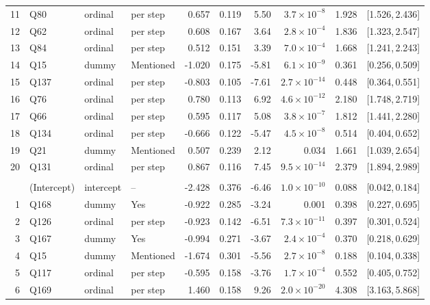 \begin{landscape}
\begin{longtable}{r l l l r r r r r c}
11 & Q80 & ordinal & per step & 0.657 & 0.119 & 5.50 & $3.7{\times}10^{-8}$ & 1.928 & [1.526,\,2.436] &  \\
12 & Q62 & ordinal & per step & 0.608 & 0.167 & 3.64 & $2.8{\times}10^{-4}$ & 1.836 & [1.323,\,2.547] &  \\
13 & Q84 & ordinal & per step & 0.512 & 0.151 & 3.39 & $7.0{\times}10^{-4}$ & 1.668 & [1.241,\,2.243] &  \\
14 & Q15 & dummy & Mentioned & -1.020 & 0.175 & -5.81 & $6.1{\times}10^{-9}$ & 0.361 & [0.256,\,0.509] &  \\
15 & Q137 & ordinal & per step & -0.803 & 0.105 & -7.61 & $2.7{\times}10^{-14}$ & 0.448 & [0.364,\,0.551] &  \\
16 & Q76 & ordinal & per step & 0.780 & 0.113 & 6.92 & $4.6{\times}10^{-12}$ & 2.180 & [1.748,\,2.719] &  \\
17 & Q66 & ordinal & per step & 0.595 & 0.117 & 5.08 & $3.8{\times}10^{-7}$ & 1.812 & [1.441,\,2.280] &  \\
18 & Q134 & ordinal & per step & -0.666 & 0.122 & -5.47 & $4.5{\times}10^{-8}$ & 0.514 & [0.404,\,0.652] &  \\
19 & Q21 & dummy & Mentioned & 0.507 & 0.239 & 2.12 & 0.034 & 1.661 & [1.039,\,2.654] &  \\
20 & Q131 & ordinal & per step & 0.867 & 0.116 & 7.45 & $9.5{\times}10^{-14}$ & 2.379 & [1.894,\,2.989] &  \\
\addlinespace[4pt]
\multicolumn{9}{l}{\textbf{Cluster 2} \quad \small $n = 2579$ ($n_{\text{in}} = 796$), AIC $= 851.0$, residual deviance $= 809.0$ on 2558 df}\\[2pt]
 & (Intercept) & intercept & -- & -2.428 & 0.376 & -6.46 & $1.0{\times}10^{-10}$ & 0.088 & [0.042,\,0.184] &  \\
1 & Q168 & dummy & Yes & -0.922 & 0.285 & -3.24 & 0.001 & 0.398 & [0.227,\,0.695] &  \\
2 & Q126 & ordinal & per step & -0.923 & 0.142 & -6.51 & $7.3{\times}10^{-11}$ & 0.397 & [0.301,\,0.524] &  \\
3 & Q167 & dummy & Yes & -0.994 & 0.271 & -3.67 & $2.4{\times}10^{-4}$ & 0.370 & [0.218,\,0.629] &  \\
4 & Q15 & dummy & Mentioned & -1.674 & 0.301 & -5.56 & $2.7{\times}10^{-8}$ & 0.188 & [0.104,\,0.338] &  \\
5 & Q117 & ordinal & per step & -0.595 & 0.158 & -3.76 & $1.7{\times}10^{-4}$ & 0.552 & [0.405,\,0.752] &  \\
6 & Q169 & ordinal & per step & 1.460 & 0.158 & 9.26 & $2.0{\times}10^{-20}$ & 4.308 & [3.163,\,5.868] &  \\

\end{longtable}
\end{landscape}
